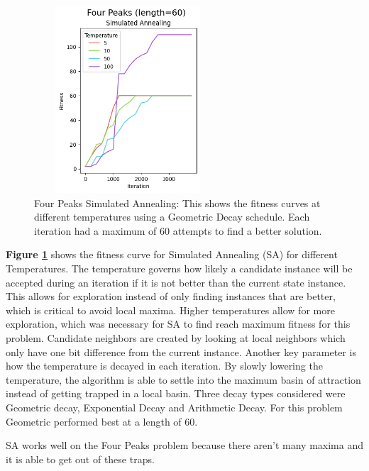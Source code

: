 \documentclass[letterpaper]{article} %
\begin{document}
\begin{figure}[!htb]
\centering
\includegraphics[width=2.75in, height=2.75in]{figures/Four_Peaks_length=60_Simulated_Annealing_l_60_ma_360_d_geom_t_5__10__50__100_.png}
\caption{Four Peaks Simulated Annealing:  This shows the fitness curves at different temperatures using a Geometric Decay schedule. Each iteration had a maximum of 60 attempts to find a better solution. }
\label{fig:four_peaks_sa}
\end{figure}

\textbf{Figure \ref{fig:four_peaks_sa}} shows the fitness curve for Simulated Annealing (SA) for different Temperatures.  The temperature governs how likely a candidate instance will be accepted during an iteration if it is not better than the current state instance.  This allows for exploration instead of only finding instances that are better, which is critical to avoid local maxima.    Higher temperatures allow for more exploration, which was necessary for SA to find reach maximum fitness for this problem.  Candidate neighbors are created by looking at local neighbors which only have one bit difference from the current instance.  Another key parameter is how the temperature is decayed in each iteration.  By slowly lowering the temperature, the algorithm is able to settle into the maximum basin of attraction instead of getting trapped in a local basin.  Three decay types considered were Geometric decay, Exponential Decay and Arithmetic Decay.  For this problem Geometric performed best at a length of 60.

SA works well on the Four Peaks problem because there aren't many maxima and it is able to get out of these traps.
\end{document}
